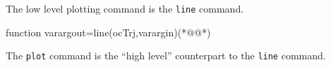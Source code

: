 The low level plotting command is the \lstinline+line+ command.
\begin{matlab}
function varargout=line(ocTrj,varargin)(*@@*)
%
%
%
%
%
%
%
\end{matlab}
The \lstinline+plot+ command is the ``high level'' counterpart to the \lstinline+line+ command.
